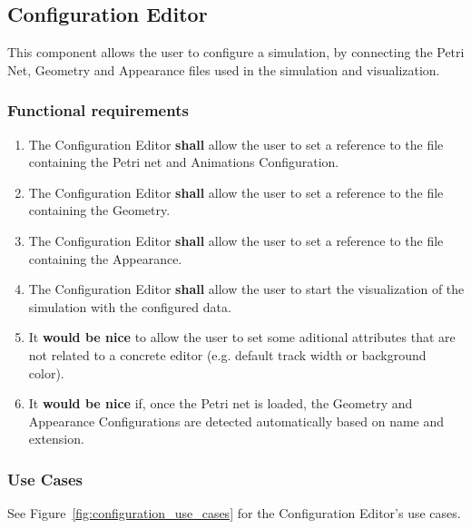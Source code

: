 \subsection{Configuration Editor}

This component allows the user to configure a simulation, by connecting the Petri
Net, Geometry and Appearance files used in the simulation and visualization.

\subsubsection{Functional requirements}

\begin{enumerate}
  \item The Configuration Editor \textbf{shall} allow the user to set a reference to the file containing the Petri net and Animations Configuration.
  \item The Configuration Editor \textbf{shall} allow the user to set a reference to the file containing the Geometry.
  \item The Configuration Editor \textbf{shall} allow the user to set a reference to the file containing the Appearance.
  \item The Configuration Editor \textbf{shall} allow the user to start the visualization of the simulation with the configured data.
  \item It \textbf{would be nice} to allow the user to set some aditional attributes that are not related to a concrete editor 
  (e.g. default track width or background color).
  \item It \textbf{would be nice} if, once the Petri net is loaded, the Geometry and Appearance Configurations are detected automatically based on name and extension.
\end{enumerate}

\subsubsection{Use Cases}

See Figure~\ref{fig:configuration_use_cases} for the Configuration Editor's use cases.

